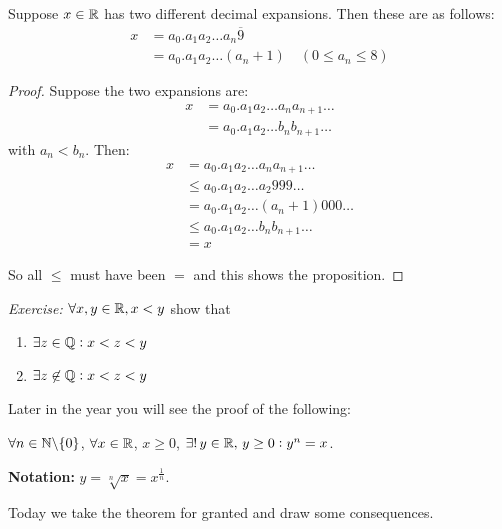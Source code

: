 \documentclass[10pt]{scrartcl}
\begin{document}
\begin{proposition}
Suppose $x\in\mathbb{R}$ has two different decimal expansions. Then these are as follows: 
\[
\begin{aligned}
  x &= a_0 . a_1a_2\dots a_n \overline{9}\\
  &= a_0. a_1a_2\dots (a_{n} + 1) \quad (0 \leq a_n \leq 8)
\end{aligned}
\]
\end{proposition}

\begin{proof}
Suppose the two expansions are:
\[
\begin{aligned}
  x &= a_0 . a_1 a_2 \dots a_n a_{n+1} \dots\\
  &= a_0 . a_1 a_2 \dots b_n b_{n+1} \dots 
\end{aligned}
\]
with $a_n < b_n$. Then: 
\[
\begin{aligned}
   x &= a_0 . a_1 a_2 \dots a_n a_{n+1} \dots \\
   &\leq a_0 . a_1a_2 \dots a_2 999\dots\\
   &= a_0 . a_1a_2 \dots (a_{n} + 1) 000\dots\\
   &\leq a_0 . a_1 a_2 \dots b_n b_{n+1} \dots \\
   &= x
\end{aligned}
\]

So all $\leq$ must have been $=$ and this shows the proposition. 
\end{proof}

\textit{Exercise:} $\forall x,y \in\mathbb{R}, x < y$ show that 
\begin{enumerate}
\item $\exists z \in\mathbb{Q}: x < z < y$
\item $\exists 	z \not \in \mathbb{Q}: x < z < y$
\end{enumerate}\vsp




Later in the year you will see the proof of the following: 
\begin{theorem} 
$\forall n \in\mathbb{N} \backslash \{0\}$, $\forall x \in\mathbb{R}$, $x \geq 0$, $\exists!\, y \in\mathbb{R},\, y \geq 0: y^n = x$. 	
\end{theorem}

\textbf{Notation:} $y = \sqrt[n]{x} = x^{\frac{1}{n}}$. 

Today we take the theorem for granted and draw some consequences. \\
\end{document}
